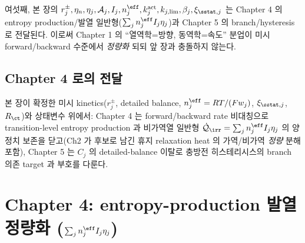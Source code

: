 여섯째, 본 장의 $r_j^\pm,\eta_n,\eta_j,\mathcal A_j,I_j,n_j^{\eff},k_j^{\mathrm{act}},k_{j,\lim},\beta_j,\xi_{\sstat,j}$ 는
Chapter 4 의 entropy production/발열 일반형($\sum_j n_j^{\eff}I_j\eta_j$)과 Chapter 5 의 branch/hysteresis 로
전달된다. 이로써 Chapter 1 의 ``열역학=방향, 동역학=속도'' 분업이 미시 forward/backward 수준에서 \emph{정량화}
되되 앞 장과 충돌하지 않는다.

\subsection*{Chapter 4 로의 전달}
본 장이 확정한 미시 kinetics($r_j^\pm$, detailed balance, $n_j^{\eff}=RT/(Fw_j)$, $\xi_{\sstat,j}$, $R_\ct$)와
상태변수 위에서: Chapter 4 는 forward/backward rate 비대칭으로 transition-level entropy production 과 비가역열
일반형 $\dot{\mathcal Q}_\irr=\sum_j n_j^{\eff}I_j\eta_j$ 의 양정치 보존을 닫고(Ch2 가 후보로 남긴 휴지
relaxation heat 의 가역/비가역 \emph{정량} 분해 포함), Chapter 5 는 $C_j$ 의 detailed-balance 이탈로 충방전
히스테리시스의 branch 의존 target 과 부호를 다룬다.



\clearpage
\section{Chapter 4: entropy-production 발열 정량화 ($\sum_j n_j^{\eff}I_j\eta_j$)}\label{chap:ch4}

